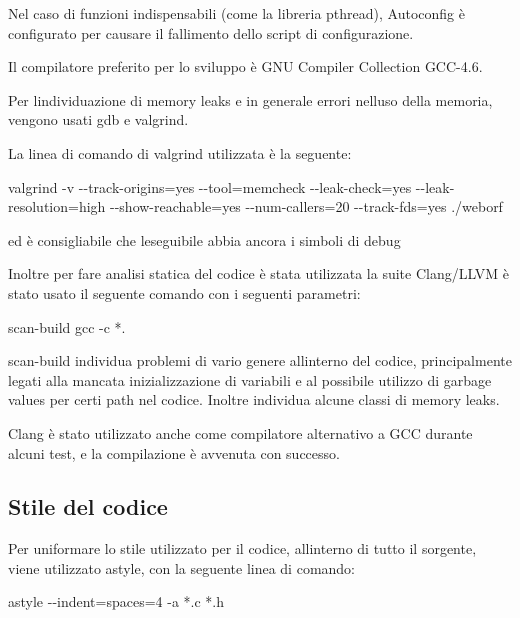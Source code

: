\documentclass[a4paper,11pt]{article}
\begin{document}
{\sffamily
Nel caso di funzioni indispensabili (come la libreria pthread),
Autoconfig \`e configurato per causare il fallimento dello script di
configurazione.}


\bigskip

{\sffamily
Il compilatore preferito per lo sviluppo \`e GNU Compiler Collection
GCC-4.6.}

{\sffamily
Per l{\textquotesingle}individuazione di memory leaks e in generale
errori nell{\textquotesingle}uso della memoria, vengono usati gdb e
valgrind.}


\bigskip

{\sffamily
La linea di comando di valgrind utilizzata \`e la seguente:}

{\ttfamily
valgrind -v -{}-track-origins=yes -{}-tool=memcheck -{}-leak-check=yes
-{}-leak-resolution=high -{}-show-reachable=yes -{}-num-callers=20
-{}-track-fds=yes ./weborf}

{\sffamily
ed \`e consigliabile che l{\textquotesingle}eseguibile abbia ancora i
simboli di debug}


\bigskip

{\sffamily
Inoltre per fare analisi statica del codice \`e stata utilizzata la
suite Clang/LLVM \`e stato usato il seguente comando con i seguenti
parametri:}

{\ttfamily
scan-build gcc -c *.}


\bigskip

{\sffamily
scan-build individua problemi di vario genere
all{\textquotesingle}interno del codice, principalmente legati alla
mancata inizializzazione di variabili e al possibile utilizzo di
garbage values per certi path nel codice. Inoltre individua alcune
classi di memory leaks.}


\bigskip

{\sffamily
Clang \`e stato utilizzato anche come compilatore alternativo a GCC
durante alcuni test, e la compilazione \`e avvenuta con successo.}


\bigskip

\subsection{Stile del codice}
{\sffamily
Per uniformare lo stile utilizzato per il codice,
all{\textquotesingle}interno di tutto il sorgente, viene utilizzato
astyle, con la seguente linea di comando:}

{\ttfamily
astyle -{}-indent=spaces=4 -a *.c *.h}


\bigskip
\end{document}

